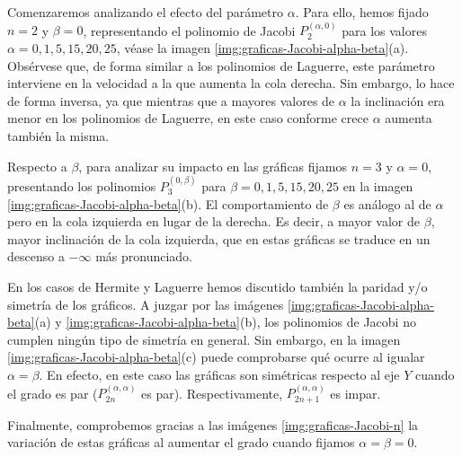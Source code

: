 Comenzaremos analizando el efecto del parámetro $\alpha$. Para ello, hemos fijado $n=2$ y $\beta=0$, representando el polinomio de Jacobi $P_2^{(\alpha,0)}$ para los valores $\alpha=0,1,5,15,20,25$, véase la imagen \ref{img:graficas-Jacobi-alpha-beta}(a). Obsérvese que, de forma similar a los polinomios de Laguerre, este parámetro interviene en la velocidad a la que aumenta la cola derecha. Sin embargo, lo hace de forma inversa, ya que mientras que a mayores valores de $\alpha$ la inclinación era menor en los polinomios de Laguerre, en este caso conforme crece $\alpha$ aumenta también la misma.

Respecto a $\beta$, para analizar su impacto en las gráficas fijamos $n=3$ y $\alpha=0$, presentando los polinomios $P_3^{(0,\beta)}$ para $\beta=0,1,5,15,20,25$ en la imagen \ref{img:graficas-Jacobi-alpha-beta}(b). El comportamiento de $\beta$ es análogo al de $\alpha$ pero en la cola izquierda en lugar de la derecha. Es decir, a mayor valor de $\beta$, mayor inclinación de la cola izquierda, que en estas gráficas se traduce en un descenso a $-\infty$ más pronunciado.

En los casos de Hermite y Laguerre hemos discutido también la paridad y/o simetría de los gráficos. A juzgar por las imágenes \ref{img:graficas-Jacobi-alpha-beta}(a) y \ref{img:graficas-Jacobi-alpha-beta}(b), los polinomios de Jacobi no cumplen ningún tipo de simetría en general. Sin embargo, en la imagen \ref{img:graficas-Jacobi-alpha-beta}(c) puede comprobarse qué ocurre al igualar $\alpha=\beta$. En efecto, en este caso las gráficas son simétricas respecto al eje $Y$ cuando el grado es par ($P_{2n}^{(\alpha,\alpha)}$ es par). Respectivamente, $P_{2n+1}^{(\alpha,\alpha)}$ es impar. 

Finalmente, comprobemos gracias a las imágenes \ref{img:graficas-Jacobi-n} la variación de estas gráficas al aumentar el grado cuando fijamos $\alpha = \beta = 0$.

